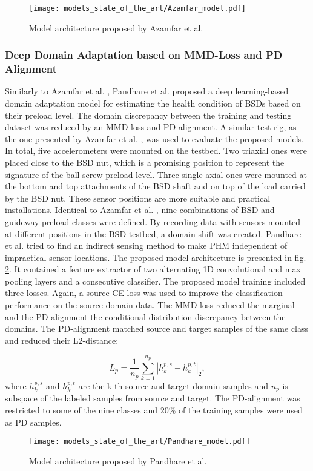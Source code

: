 \begin{figure}[H]
  \centering
  \texttt{[image: models\_state\_of\_the\_art/Azamfar\_model.pdf]}
  \caption{Model architecture proposed by Azamfar et al. \cite{AZAMFAR2020103932}}
  \label{fig:Azamfar_model}
\end{figure}


\subsubsection{Deep Domain Adaptation based on MMD-Loss and PD Alignment}
Similarly to Azamfar et al. \cite{AZAMFAR2020103932}, Pandhare et al. \cite{Pandhare2021} proposed a deep learning-based domain adaptation model for estimating the health condition of BSDs based on their preload level. The domain discrepancy between the training and testing dataset was reduced by an MMD-loss and PD-alignment. A similar test rig, as the one presented by Azamfar et al. \cite{AZAMFAR2020103932}, was used to evaluate the proposed models. In total, five accelerometers were mounted on the testbed. Two triaxial ones were placed close to the BSD nut, which is a promising position to represent the signature of the ball screw preload level. Three single-axial ones were mounted at the bottom and top attachments of the BSD shaft and on top of the load carried by the BSD nut. These sensor positions are more suitable and practical installations. Identical to Azamfar et al. \cite{AZAMFAR2020103932}, nine combinations of BSD and guideway preload classes were defined. By recording data with sensors mounted at different positions in the BSD testbed, a domain shift was created. Pandhare et al. \cite{Pandhare2021} tried to find an indirect sensing method to make PHM independent of impractical sensor locations. The proposed model architecture is presented in fig. \ref{fig:Pandhare_model}. It contained a feature extractor of two alternating 1D convolutional and max pooling layers and a consecutive classifier. The proposed model training included three losses. Again, a source CE-loss was used to improve the classification performance on the source domain data. The MMD loss reduced the marginal and the PD alignment the conditional distribution discrepancy between the domains. The PD-alignment matched source and target samples of the same class and reduced their L2-distance: 

\begin{equation}
    L_{p} = \frac{1}{n_{p}}\sum_{k=1}^{n_{p}}|h_{k}^{p,s}-h_{k}^{p,t}|_{2}, 
\end{equation}
where $h_{k}^{p,s}$ and $h_{k}^{p,t}$ are the k-th source and target domain samples and $n_{p}$ is subspace of the labeled samples from source and target. The PD-alignment was restricted to some of the nine classes and 20\% of the training samples were used as PD samples.
\begin{figure}[H]
  \centering
  \texttt{[image: models\_state\_of\_the\_art/Pandhare\_model.pdf]}
  \caption{Model architecture proposed by Pandhare et al. \cite{Pandhare2021}}
  \label{fig:Pandhare_model}
\end{figure}

